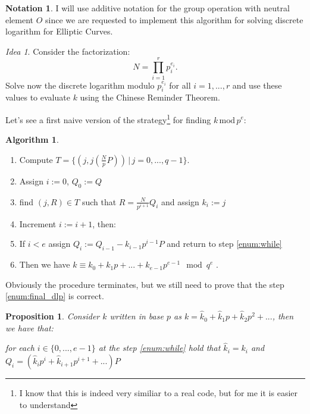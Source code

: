 \documentclass{article}
\theoremstyle{plain}
\newtheorem{prop}[teo]{Proposition}
\theoremstyle{remark}
\newtheorem{idea}[rem]{Idea}
\theoremstyle{definition}
\newtheorem{algo}[teo]{Algorithm}
\newtheorem*{nota}{Notation}
\begin{document}
\begin{nota}
	I will use additive notation for the group operation with neutral element $O$ since we are requested to implement this algorithm for solving discrete logarithm for Elliptic Curves. 
\end{nota}

\begin{idea} \label{idea:ecdlp}
	Consider the factorization:
\begin{equation*}
	N = \prod_{i=1}^r p_i^{e_i}.
\end{equation*}
	Solve now the discrete logarithm modulo $p_i^{e_i}$ for all $i = 1,...,r$ and use these values to evaluate $k$ using the Chinese Reminder Theorem. 
\end{idea}

Let's see a first naive version of the strategy\footnote{I know that this is indeed very similiar to a real code, but for me it is easier to understand} for finding $k \,\text{mod}\, p^e$:

\begin{algo}\label{algo:ecdlp_naive}

	\begin{enumerate}
		\item \label{enum:store} Compute $T = \{ (j,j\left(\frac{N}{p}P\right)) \,|\, j = 0,...,q-1 \}$.
		\item Assign $i := 0$, $Q_0 := Q$
		\item \label{enum:while} find $(j,R)\in T$ such that $R = \frac{N}{p^{i+1}}Q_i$ and assign $k_i := j$
		\item Increment $i := i + 1$, then:
		\item \label{enum:if} If $i < e$ assign $Q_i := Q_{i-1} - k_{i-1} p^{i-1}P$ and return to step \ref{enum:while}
		\item Then we have $k \equiv k_0 + k_1p + ... + k_{e-1}p^{e-1} \mod q^e$ \label{enum:final_dlp}.
	\end{enumerate}

\end{algo}


Obviously the procedure terminates, but we still need to prove that the step \ref{enum:final_dlp} is correct.

\begin{prop}
	\label{prop:corr_dlp}
	Consider $k$ written in base $p$ as $k = \hat{k}_0 + \hat{k}_1p + \hat{k}_2p^2 + ...$, then we have that:

	for each $i \in \{0,...,e-1\}$ at the step \ref{enum:while} hold that 
	$\hat{k}_i = k_i$ and $Q_i = (\hat{k}_ip^i + \hat{k}_{i+1}p^{i+1} + ... )P$
\end{prop}
\end{document}
